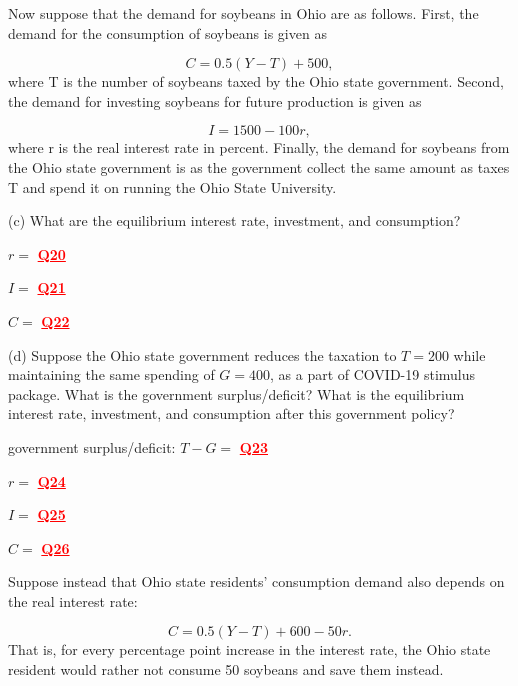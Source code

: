 \documentclass[14pt]{extarticle}
\newcommand{\red}[1]{\textcolor{red}{#1}}
\begin{document}
Now suppose that the demand for soybeans in Ohio are as follows. First, the demand for the consumption of soybeans is given as

%
\begin{equation}
\label{eq:demand}
    C = 0.5( Y - T ) + 500
,\end{equation}
%
where T is the number of soybeans taxed by the Ohio state government. Second, the demand for investing soybeans for future production is given as

%
\begin{equation}
\label{eq:investment}
    I = 1500 - 100r
,\end{equation}
%
where r is the real interest rate in percent. Finally, the demand for soybeans from the Ohio state government is  as the government collect the same amount as taxes T and spend it on running the Ohio State University.

(c) What are the equilibrium interest rate, investment, and consumption?

\begin{center}
    $ r =  $   \textbf{\red{\underline{\quad Q20 \quad}}}

    $ I =  $   \textbf{\red{\underline{\quad Q21 \quad}}}

    $ C =  $   \textbf{\red{\underline{\quad Q22 \quad}}}
\end{center}


(d) Suppose the Ohio state government reduces the taxation to $ T = 200 $ while maintaining the same spending of $ G = 400 $, as a part of COVID-19 stimulus package.
What is the government surplus/deficit? What is the equilibrium interest rate, investment, and consumption after this government policy?

\begin{center}
    government surplus/deficit: $ T - G = $ \textbf{\red{\underline{\quad Q23 \quad}}}

    $ r =  $   \textbf{\red{\underline{\quad Q24 \quad}}}

    $ I =  $   \textbf{\red{\underline{\quad Q25 \quad}}}

    $ C =  $   \textbf{\red{\underline{\quad Q26 \quad}}}
\end{center}


Suppose instead that Ohio state residents' consumption demand also depends on the real interest rate:

%
\begin{equation}
\label{eq:demand_interestrate}
    C = 0.5 ( Y-T ) + 600 - 50r
.\end{equation}
%
That is, for every percentage point increase in the interest rate, the Ohio state resident would rather not consume 50 soybeans and save them instead.
\end{document}
